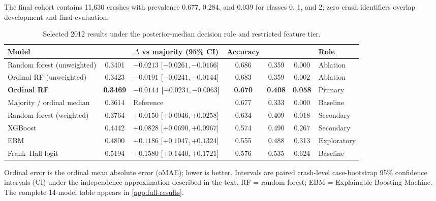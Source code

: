 \documentclass[11pt,letterpaper]{article}
\newcommand{\CI}{95\% CI}
\begin{document}
The final cohort contains 11,630 crashes with prevalence 0.677, 0.284, and 0.039 for classes 0, 1, and 2; zero crash identifiers overlap development and final evaluation.

\begin{table}[htbp]
\centering
\begin{threeparttable}
\caption{Selected 2012 results under the posterior-median decision rule and restricted feature tier.}
\label{tab:key-results}
{\footnotesize\setlength{\tabcolsep}{3.35pt}%
\begin{tabularx}{\textwidth}{@{}L{0.202\textwidth} S[table-format=1.4] L{0.202\textwidth} S[table-format=1.3] S[table-format=1.3] S[table-format=1.3] L{0.095\textwidth}@{}}
\toprule
{\textbf{Model}} & {\textbf{}} & {\textbf{$\Delta$ vs majority (\CI{})}} & {\textbf{Accuracy}} & {\textbf{}} & {\textbf{}} & {\textbf{Role}} \\
\midrule
Random forest (unweighted) & 0.3401 & $-0.0213$ [$-0.0261,-0.0166$] & 0.686 & 0.359 & 0.000 & Ablation \\
Ordinal RF (unweighted) & 0.3423 & $-0.0191$ [$-0.0241,-0.0144$] & 0.683 & 0.359 & 0.002 & Ablation \\
\textbf{Ordinal RF} & \bfseries 0.3469 & \textbf{$-0.0144$ [$-0.0231,-0.0063$]} & \bfseries 0.670 & \bfseries 0.408 & \bfseries 0.058 & Primary \\
Majority / ordinal median & 0.3614 & Reference & 0.677 & 0.333 & 0.000 & Baseline \\
Random forest (weighted) & 0.3764 & $+0.0150$ [$+0.0046,+0.0258$] & 0.634 & 0.409 & 0.018 & Secondary \\
XGBoost & 0.4442 & $+0.0828$ [$+0.0690,+0.0967$] & 0.574 & 0.490 & 0.267 & Secondary \\
EBM & 0.4800 & $+0.1186$ [$+0.1047,+0.1324$] & 0.555 & 0.488 & 0.313 & Exploratory \\
Frank--Hall logit & 0.5194 & $+0.1580$ [$+0.1440,+0.1721$] & 0.576 & 0.535 & 0.624 & Baseline \\
\bottomrule
\end{tabularx}}
\begin{tablenotes}[flushleft]\footnotesize
\item Ordinal error is the ordinal mean absolute error (oMAE); lower is better. Intervals are paired crash-level case-bootstrap 95\% confidence intervals (CI) under the independence approximation described in the text. RF = random forest; EBM = Explainable Boosting Machine. The complete 14-model table appears in \cref{app:full-results}.
\end{tablenotes}
\end{threeparttable}
\end{table}
\end{document}
